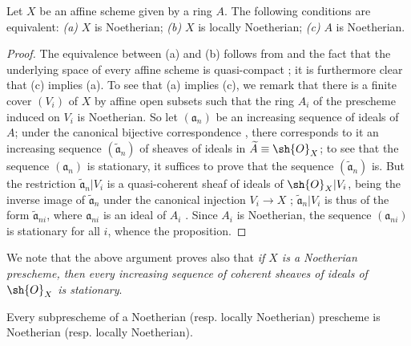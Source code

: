 \begin{proposition}[6.1.3]
\label{I.6.1.3}
Let $X$ be an affine scheme given by a ring $A$.
The following conditions are equivalent:
\emph{(a)} $X$ is Noetherian;
\emph{(b)} $X$ is locally Noetherian;
\emph{(c)} $A$ is Noetherian.
\end{proposition}

\begin{proof}
The equivalence between (a) and (b) follows from  and the fact that the underlying space of every affine scheme is quasi-compact ; it is furthermore clear that (c) implies (a).
To see that (a) implies (c), we remark that there is a finite cover $(V_i)$ of $X$ by affine open subsets such that the ring $A_i$ of the prescheme induced on $V_i$ is Noetherian.
So let $(\mathfrak{a}_n)$ be an increasing sequence of ideals of $A$; under the canonical bijective correspondence , there corresponds to it an increasing sequence $(\widetilde{\mathfrak{a}}_n)$ of sheaves of ideals in $\widetilde{A}\equiv\sh{O}_X$;
to see that the sequence $(\mathfrak{a}_n)$ is stationary, it suffices to prove that the sequence $(\widetilde{\mathfrak{a}}_n)$ is.
But the restriction $\widetilde{\mathfrak{a}}_n|V_i$ is a quasi-coherent sheaf of ideals of $\sh{O}_X|V_i$, being the inverse image of $\widetilde{\mathfrak{a}}_n$ under the canonical injection $V_i\to X$ ;
$\widetilde{\mathfrak{a}}_n|V_i$ is thus of the form $\widetilde{\mathfrak{a}}_{ni}$, where $\mathfrak{a}_{ni}$ is an ideal of $A_i$ .
Since $A_i$ is Noetherian, the sequence $(\mathfrak{a}_{ni})$ is stationary for all $i$, whence the proposition.
\end{proof}

We note that the above argument proves also that \emph{if $X$ is a Noetherian prescheme, then every increasing sequence of coherent sheaves of ideals of $\sh{O}_X$ is stationary}.

\begin{proposition}[6.1.4]
\label{I.6.1.4}
Every subprescheme of a Noetherian (resp. locally Noetherian) prescheme is Noetherian (resp. locally Noetherian).
\end{proposition}

